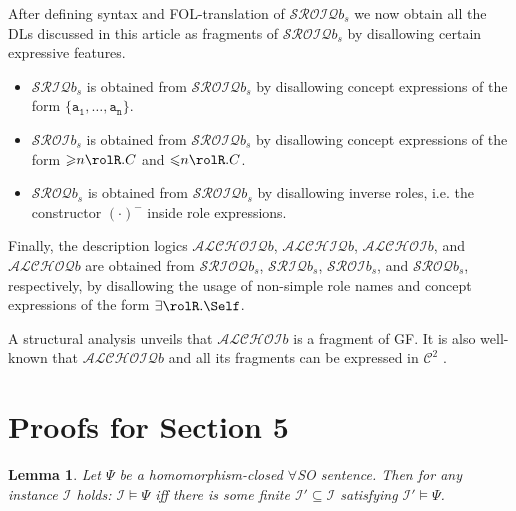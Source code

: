 \documentclass[10pt,a4paper]{amsart}
\theoremstyle{definition}
\numberwithin{equation}{section}
\theoremstyle{plain}
\newtheorem{lemma}[lemma]{Lemma}
\theoremstyle{definition}
\theoremstyle{myexample}
\theoremstyle{plain}
\theoremstyle{definition}
\newcommand{\instance}{\mathcal{I}}
\newcommand{\iffi}{\textit{iff} } %
\begin{document}
\medskip

After defining syntax and FOL-translation of $\mathcal{SROIQ}b_s$ we now obtain all the DLs discussed in this article as fragments of $\mathcal{SROIQ}b_s$ by disallowing certain expressive features.

\begin{itemize}
\item $\mathcal{SRIQ}b_s$ is obtained from $\mathcal{SROIQ}b_s$ by disallowing concept expressions of the form $\{\mathtt{a_1}, \ldots, \mathtt{a_n}\}$.
\item $\mathcal{SROI}b_s$ is obtained from $\mathcal{SROIQ}b_s$ by disallowing concept expressions of the form
${\geqslant}n\rolR. C$ and ${\leqslant}n\rolR. C$. 
\item $\mathcal{SROQ}b_s$ is obtained from $\mathcal{SROIQ}b_s$ by disallowing inverse roles, i.e. the constructor $(\cdot)^-$ inside role expressions.	
\end{itemize} 
Finally, the description logics $\mathcal{ALCHOIQ}b$, $\mathcal{ALCHIQ}b$, $\mathcal{ALCHOI}b$, and $\mathcal{ALCHOQ}b$ are obtained from $\mathcal{SRIOQ}b_s$, $\mathcal{SRIQ}b_s$, $\mathcal{SROI}b_s$, and $\mathcal{SROQ}b_s$, respectively, by disallowing the usage of non-simple role names and concept expressions of the form $\exists\rolR.\Self$.

A structural analysis unveils that $\mathcal{ALCHOI}b$ is a fragment of GF. It is also well-known that $\mathcal{ALCHOIQ}b$ and all its fragments can be expressed in $\mathcal{C}^2$ \cite{RudolphKH08b}.


\section{Proofs for Section 5}


\begin{lemma}\label{lem:interesting}
Let $\Psi$ be a homomorphism-closed $\forall$SO sentence.
Then for any instance $\instance$ holds: $\instance \models \Psi$ \iffi there is some finite $\instance' \subseteq \instance$ satisfying $\instance' \models \Psi$.
\end{lemma}
\end{document}
